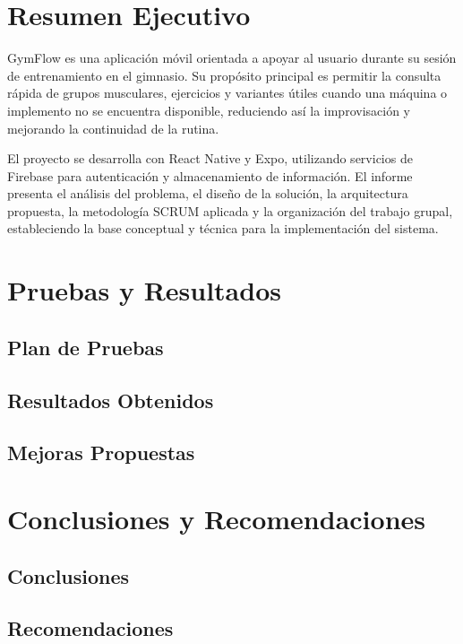 \documentclass[12pt,letterpaper]{article}
\begin{document}
%


\clearpage
\section{Resumen Ejecutivo}

GymFlow es una aplicación móvil orientada a apoyar al usuario durante su sesión de entrenamiento en el gimnasio. Su propósito principal es permitir la consulta rápida de grupos musculares, ejercicios y variantes útiles cuando una máquina o implemento no se encuentra disponible, reduciendo así la improvisación y mejorando la continuidad de la rutina.

El proyecto se desarrolla con React Native y Expo, utilizando servicios de Firebase para autenticación y almacenamiento de información. El informe presenta el análisis del problema, el diseño de la solución, la arquitectura propuesta, la metodología SCRUM aplicada y la organización del trabajo grupal, estableciendo la base conceptual y técnica para la implementación del sistema.






\section{Pruebas y Resultados}

\subsection{Plan de Pruebas}

\subsection{Resultados Obtenidos}

\subsection{Mejoras Propuestas}

\section{Conclusiones y Recomendaciones}

\subsection{Conclusiones}

\subsection{Recomendaciones}

\clearpage
\printbibliography[title={BIBLIOGRAFÍA}]
\end{document}
